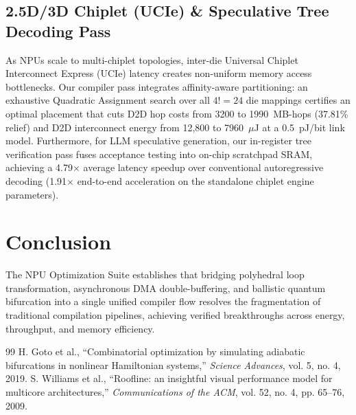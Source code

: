 ﻿\documentclass[journal]{IEEEtran}
\begin{document}
\subsection{2.5D/3D Chiplet (UCIe) \& Speculative Tree Decoding Pass}
As NPUs scale to multi-chiplet topologies, inter-die Universal Chiplet Interconnect Express (UCIe) latency creates non-uniform memory access bottlenecks. Our compiler pass integrates affinity-aware partitioning: an exhaustive Quadratic Assignment search over all $4! = 24$ die mappings certifies an optimal placement that cuts D2D hop costs from 3200 to 1990~MB-hops (37.81\% relief) and D2D interconnect energy from 12{,}800 to 7960~$\mu$J at a 0.5~pJ/bit link model. Furthermore, for LLM speculative generation, our in-register tree verification pass fuses acceptance testing into on-chip scratchpad SRAM, achieving a 4.79$\times$ average latency speedup over conventional autoregressive decoding (1.91$\times$ end-to-end acceleration on the standalone chiplet engine parameters).

\section{Conclusion}
The NPU Optimization Suite establishes that bridging polyhedral loop transformation, asynchronous DMA double-buffering, and ballistic quantum bifurcation into a single unified compiler flow resolves the fragmentation of traditional compilation pipelines, achieving verified breakthroughs across energy, throughput, and memory efficiency.


\begin{thebibliography}{99}
 H. Goto et al., ``Combinatorial optimization by simulating adiabatic bifurcations in nonlinear Hamiltonian systems,'' \emph{Science Advances}, vol. 5, no. 4, 2019.
 S. Williams et al., ``Roofline: an insightful visual performance model for multicore architectures,'' \emph{Communications of the ACM}, vol. 52, no. 4, pp. 65--76, 2009.
\end{thebibliography}
\end{document}
